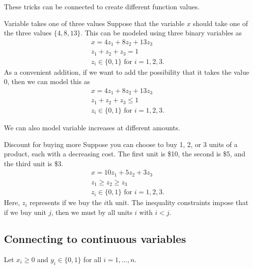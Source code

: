 These tricks can be connected to create different function values.  

\begin{example}{Variable takes one of three values}{}
Suppose that the variable $x$ should take one of the three values $\{4, 8, 13\}$. This can be modeled using three binary variables as
\begin{align*}
x=4z_1 +8z_2 +13z_3\\
 z_1 +z_2 +z_3 =1\\
z_i \in \{0, 1\} \text{ for } i = 1, 2,3.
\end{align*}
As a convenient addition, if we want to add the possibility that it takes the value $0$, then we can model this as 
\begin{align*}
x=4z_1 +8z_2 +13z_3\\
 z_1 +z_2 +z_3 \leq 1\\
z_i \in \{0, 1\} \text{ for } i = 1, 2,3.
\end{align*}
\end{example}


We can also model variable increases at different amounts.  \begin{example}{Discount for buying more}{}
Suppose you can choose to buy 1, 2, or 3 units of a product, each with a decreasing cost.  The first unit is \$10, the second is \$5, and the third unit is \$3.
\begin{align*}
x=10z_1 +5z_2 +3z_3\\
 z_1\geq z_2 \geq z_3\\
z_i \in \{0, 1\} \text{ for } i = 1, 2,3.
\end{align*}
Here, $z_i$ represents if we buy the $i$th unit.  The inequality constraints impose that if we buy unit $j$, then we must by all units $i$ with $i < j$.
\end{example}


\subsection{Connecting to continuous variables}

Let $x_i \geq 0$ and $y_i \in \{0,1\}$ for all $i=1, \dots, n$.

